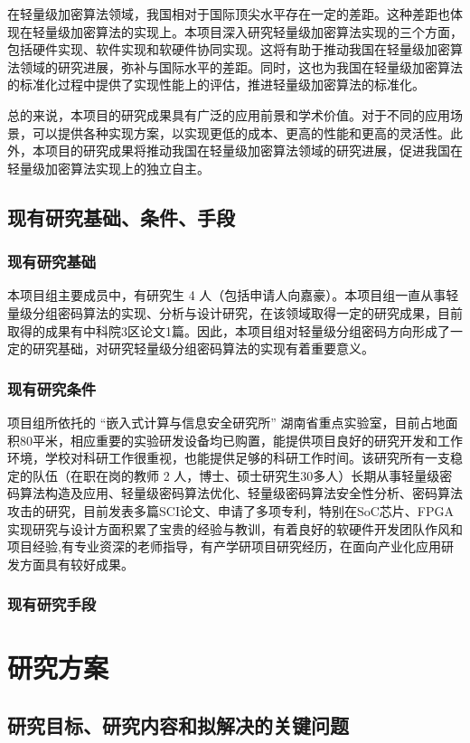 \documentclass{ctexart}
\begin{document}
在轻量级加密算法领域，我国相对于国际顶尖水平存在一定的差距。这种差距也体现在轻量级加密算法的实现上。本项目深入研究轻量级加密算法实现的三个方面，包括硬件实现、软件实现和软硬件协同实现。这将有助于推动我国在轻量级加密算法领域的研究进展，弥补与国际水平的差距。同时，这也为我国在轻量级加密算法的标准化过程中提供了实现性能上的评估，推进轻量级加密算法的标准化。

总的来说，本项目的研究成果具有广泛的应用前景和学术价值。对于不同的应用场景，可以提供各种实现方案，以实现更低的成本、更高的性能和更高的灵活性。此外，本项目的研究成果将推动我国在轻量级加密算法领域的研究进展，促进我国在轻量级加密算法实现上的独立自主。

\subsection{现有研究基础、条件、手段}
\subsubsection{现有研究基础}
本项目组主要成员中，有研究生 4 人（包括申请人向嘉豪）。本项目组一直从事轻量级分组密码算法的实现、分析与设计研究，在该领域取得一定的研究成果，目前取得的成果有中科院3区论文1篇。因此，本项目组对轻量级分组密码方向形成了一定的研究基础，对研究轻量级分组密码算法的实现有着重要意义。
\subsubsection{现有研究条件}
项目组所依托的 “嵌入式计算与信息安全研究所” 湖南省重点实验室，目前占地面积80平米，相应重要的实验研发设备均已购置，能提供项目良好的研究开发和工作环境，学校对科研工作很重视，也能提供足够的科研工作时间。该研究所有一支稳定的队伍（在职在岗的教师 2 人，博士、硕士研究生30多人）长期从事轻量级密码算法构造及应用、轻量级密码算法优化、轻量级密码算法安全性分析、密码算法攻击的研究，目前发表多篇SCI论文、申请了多项专利，特别在SoC芯片、FPGA实现研究与设计方面积累了宝贵的经验与教训，有着良好的软硬件开发团队作风和项目经验,有专业资深的老师指导，有产学研项目研究经历，在面向产业化应用研发方面具有较好成果。

\subsubsection{现有研究手段}


\section{研究方案}
\subsection{研究目标、研究内容和拟解决的关键问题}
\end{document}
